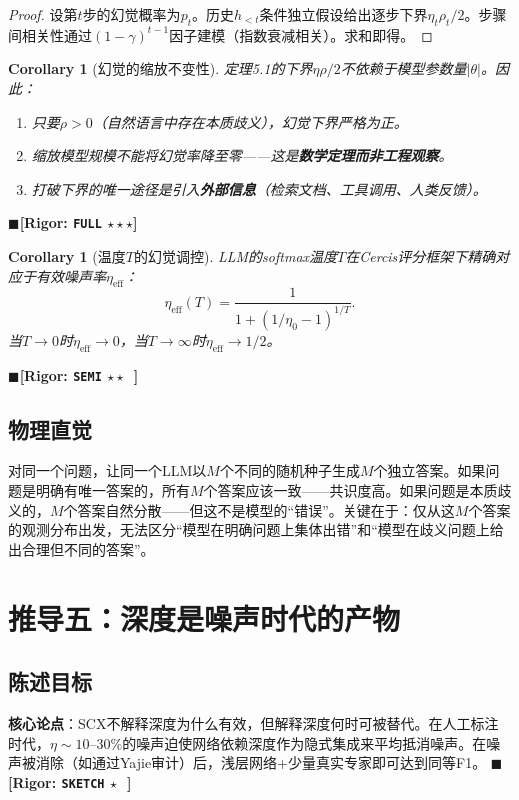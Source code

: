 \documentclass[12pt,a4paper]{ctexart}
\newtheorem{corollary}[theorem]{Corollary}
\theoremstyle{definition}
\theoremstyle{remark}
\newcommand{\rigorFull}{$\blacksquare$\;\textbf{[Rigor: \texttt{FULL} $\star\star\star$]}}
\newcommand{\rigorSemi}{$\blacksquare$\;\textbf{[Rigor: \texttt{SEMI} $\star\star\;\;$]}}
\newcommand{\rigorSketch}{$\blacksquare$\;\textbf{[Rigor: \texttt{SKETCH} $\star\;\;\,$]}}
\begin{document}
\begin{proof}
设第$t$步的幻觉概率为$p_t$。历史$h_{<t}$条件独立假设给出逐步下界$\eta_t\rho_t/2$。步骤间相关性通过$(1-\gamma)^{t-1}$因子建模（指数衰减相关）。求和即得。
\end{proof}

\begin{corollary}[幻觉的缩放不变性]
\label{cor:5.1}
定理5.1的下界$\eta\rho/2$不依赖于模型参数量$|\theta|$。因此：
\begin{enumerate}[label=\arabic*.]
\item 只要$\rho > 0$（自然语言中存在本质歧义），幻觉下界严格为正。
\item 缩放模型规模不能将幻觉率降至零——这是\textbf{数学定理而非工程观察}。
\item 打破下界的唯一途径是引入\textbf{外部信息}（检索文档、工具调用、人类反馈）。
\end{enumerate}
\end{corollary}
\rigorFull

\begin{corollary}[温度$T$的幻觉调控]
\label{cor:5.2}
LLM的softmax温度$T$在Cercis评分框架下精确对应于有效噪声率$\eta_{\text{eff}}$：
\begin{equation}
\eta_{\text{eff}}(T) = \frac{1}{1 + (1/\eta_0 - 1)^{1/T}}.
\end{equation}
当$T \to 0$时$\eta_{\text{eff}} \to 0$，当$T \to \infty$时$\eta_{\text{eff}} \to 1/2$。
\end{corollary}
\rigorSemi

\subsection{物理直觉}
对同一个问题，让同一个LLM以$M$个不同的随机种子生成$M$个独立答案。如果问题是明确有唯一答案的，所有$M$个答案应该一致——共识度高。如果问题是本质歧义的，$M$个答案自然分散——但这不是模型的``错误''。关键在于：仅从这$M$个答案的观测分布出发，无法区分``模型在明确问题上集体出错''和``模型在歧义问题上给出合理但不同的答案''。

\section{推导五：深度是噪声时代的产物}
\label{sec:depth-noise}

\subsection{陈述目标}
\textbf{核心论点}：SCX不解释深度为什么有效，但解释深度何时可被替代。在人工标注时代，$\eta \sim 10\text{--}30\%$的噪声迫使网络依赖深度作为隐式集成来平均抵消噪声。在噪声被消除（如通过Yajie审计）后，浅层网络+少量真实专家即可达到同等F1。
\rigorSketch
\end{document}
